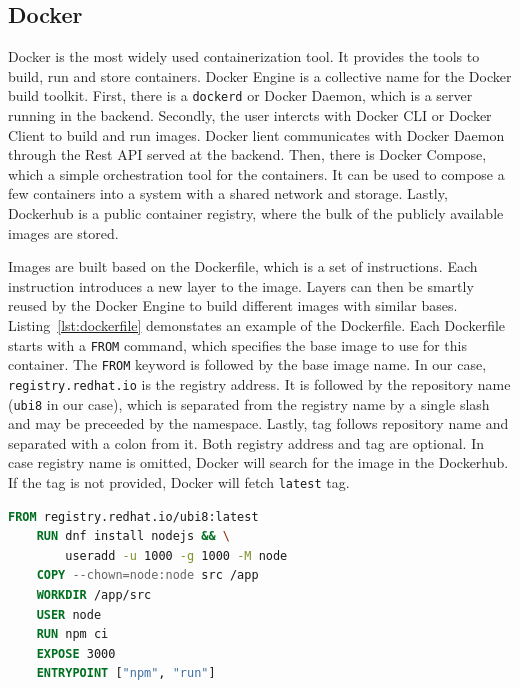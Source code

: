 \subsection{Docker}
    
Docker is the most widely used containerization tool. It provides the tools to build, run and store containers. Docker Engine is a collective name for the Docker build toolkit. First, there is a \lstinline{dockerd} or Docker Daemon, which is a server running in the backend. Secondly, the user intercts with Docker CLI or Docker Client to build and run images. Docker lient communicates with Docker Daemon through the Rest API served at the backend. Then, there is Docker Compose, which a simple orchestration tool for the containers. It can be used to compose a few containers into a system with a shared network and storage. Lastly, Dockerhub is a public container registry, where the bulk of the publicly available images are stored.

Images are built based on the Dockerfile, which is a set of instructions. Each instruction introduces a new layer to the image. Layers can then be smartly reused by the Docker Engine to build different images with similar bases. Listing~\ref{lst:dockerfile} demonstates an example of the Dockerfile. Each Dockerfile starts with a \lstinline{FROM} command, which specifies the base image to use for this container. The \lstinline{FROM} keyword is followed by the base image name. In our case, \lstinline{registry.redhat.io} is the registry address. It is followed by the repository name (\lstinline{ubi8} in our case), which is separated from the registry name by a single slash and may be preceeded by the namespace. Lastly, tag follows repository name and separated with a colon from it. Both registry address and tag are optional. In case registry name is omitted, Docker will search for the image in the Dockerhub. If the tag is not provided, Docker will fetch \lstinline{latest} tag.

\begin{lstlisting}[language=Dockerfile, caption={[A simple Dockerfile for a NodeJS app] A simple Dockerfile for a NodeJS app.}, label={lst:dockerfile}]
    FROM registry.redhat.io/ubi8:latest
    RUN dnf install nodejs && \
        useradd -u 1000 -g 1000 -M node
    COPY --chown=node:node src /app
    WORKDIR /app/src
    USER node
    RUN npm ci
    EXPOSE 3000
    ENTRYPOINT ["npm", "run"]
\end{lstlisting}

